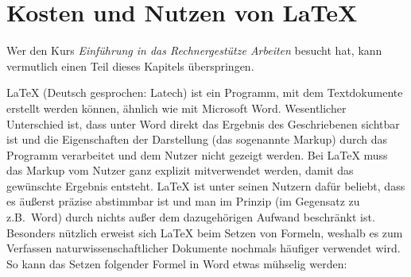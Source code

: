 \section{Kosten und Nutzen von LaTeX}
Wer den Kurs \textit{Einführung in das Rechnergestütze Arbeiten} besucht hat, kann vermutlich einen Teil dieses Kapitels überspringen.

LaTeX (Deutsch gesprochen: \glqq Latech\grqq) ist ein Programm, mit dem Textdokumente erstellt werden können, ähnlich wie mit Microsoft Word. Wesentlicher Unterschied ist, dass unter Word direkt das Ergebnis des Geschriebenen sichtbar ist und die Eigenschaften der Darstellung (das sogenannte Markup) durch das Programm verarbeitet und dem Nutzer nicht gezeigt werden. Bei LaTeX muss das Markup vom Nutzer ganz explizit mitverwendet werden, damit das gewünschte Ergebnis entsteht. LaTeX ist unter seinen Nutzern dafür beliebt, dass es äußerst präzise abstimmbar ist und man im Prinzip (im Gegensatz zu z.B.~Word) durch nichts außer dem dazugehörigen Aufwand beschränkt ist.
Besonders nützlich erweist sich LaTeX beim Setzen von Formeln, weshalb es zum Verfassen naturwissenschaftlicher Dokumente nochmals häufiger verwendet wird. So kann das Setzen folgender Formel in Word etwas mühselig werden:

